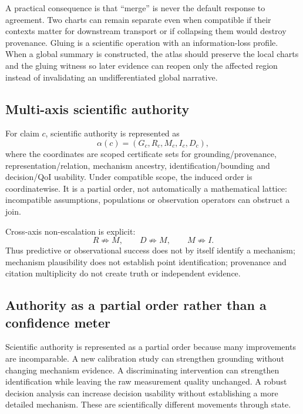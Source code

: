 A practical consequence is that ``merge'' is never the default response to agreement. Two charts can remain separate even when compatible if their contexts matter for downstream transport or if collapsing them would destroy provenance. Gluing is a scientific operation with an information-loss profile. When a global summary is constructed, the atlas should preserve the local charts and the gluing witness so later evidence can reopen only the affected region instead of invalidating an undifferentiated global narrative.

\subsection{Multi-axis scientific authority}
For claim $c$, scientific authority is represented as
\begin{equation}\alpha(c)=(G_c,R_c,M_c,I_c,D_c),\end{equation}
where the coordinates are scoped certificate sets for grounding/provenance, representation/relation, mechanism ancestry, identification/bounding and decision/QoI usability. Under compatible scope, the induced order is coordinatewise. It is a partial order, not automatically a mathematical lattice: incompatible assumptions, populations or observation operators can obstruct a join.

Cross-axis non-escalation is explicit:
\begin{equation}R\not\Rightarrow M,\qquad D\not\Rightarrow M,\qquad M\not\Rightarrow I.\end{equation}
Thus predictive or observational success does not by itself identify a mechanism; mechanism plausibility does not establish point identification; provenance and citation multiplicity do not create truth or independent evidence.

\subsection{Authority as a partial order rather than a confidence meter}

Scientific authority is represented as a partial order because many improvements are incomparable. A new calibration study can strengthen grounding without changing mechanism evidence. A discriminating intervention can strengthen identification while leaving the raw measurement quality unchanged. A robust decision analysis can increase decision usability without establishing a more detailed mechanism. These are scientifically different movements through state.

